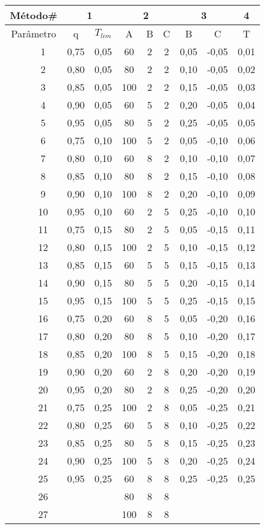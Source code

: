 \begin{table}[htb]
{
	\begin{tabular}{cc|cc|ccc|cc|c}
		\toprule
		\multicolumn{2}{c}{Método\#} & \multicolumn{2}{c}{1} & \multicolumn{3}{c}{2} & \multicolumn{2}{c}{3} & 4\\
		\midrule
		\multicolumn{2}{c}{Parâmetro}	&q&$T_{lim}$&A&B&C&B&C&T \\
		\midrule \midrule					
		\multirow{27}{*}{\rotatebox{90}{Índice da Combinação}} &
		 1 			&0,75&0,05			&60  & 2 & 2			&0,05&-0,05			&0,01\\
		&2 			&0,80&0,05			&80  & 2 & 2			&0,10&-0,05			&0,02\\
		&3 			&0,85&0,05			&100 & 2 & 2			&0,15&-0,05			&0,03\\
		&4 			&0,90&0,05			&60  & 5 & 2			&0,20&-0,05			&0,04\\
		&5 			&0,95&0,05			&80  & 5 & 2			&0,25&-0,05			&0,05\\
		&6 			&0,75&0,10			&100 & 5 & 2			&0,05&-0,10			&0,06\\
		&7 			&0,80&0,10			&60  & 8 & 2			&0,10&-0,10			&0,07\\
		&8 			&0,85&0,10			&80  & 8 & 2			&0,15&-0,10			&0,08\\
		&9 			&0,90&0,10			&100 & 8 & 2			&0,20&-0,10			&0,09\\
		&10			&0,95&0,10			&60  & 2 & 5			&0,25&-0,10			&0,10\\
		&11			&0,75&0,15			&80  & 2 & 5			&0,05&-0,15			&0,11\\
		&12			&0,80&0,15			&100 & 2 & 5			&0,10&-0,15			&0,12\\
		&13			&0,85&0,15			&60  & 5 & 5			&0,15&-0,15			&0,13\\
		&14			&0,90&0,15			&80  & 5 & 5			&0,20&-0,15			&0,14\\
		&15			&0,95&0,15			&100 & 5 & 5			&0,25&-0,15			&0,15\\
		&16			&0,75&0,20			&60  & 8 & 5			&0,05&-0,20			&0,16\\
		&17			&0,80&0,20			&80  & 8 & 5			&0,10&-0,20			&0,17\\
		&18			&0,85&0,20			&100 & 8 & 5			&0,15&-0,20			&0,18\\
		&19			&0,90&0,20			&60  & 2 & 8			&0,20&-0,20			&0,19\\
		&20			&0,95&0,20			&80  & 2 & 8			&0,25&-0,20			&0,20\\
		&21			&0,75&0,25			&100 & 2 & 8			&0,05&-0,25			&0,21\\
		&22			&0,80&0,25			&60  & 5 & 8			&0,10&-0,25			&0,22\\
		&23			&0,85&0,25			&80  & 5 & 8			&0,15&-0,25			&0,23\\
		&24			&0,90&0,25			&100 & 5 & 8			&0,20&-0,25			&0,24\\
		&25			&0,95&0,25			&60  & 8 & 8			&0,25&-0,25			&0,25\\
		&26			&    &    			&80  & 8 & 8			&	 &				&\\
		&27			&    &    			&100 & 8 & 8			&	 &				&\\
		\bottomrule
	\end{tabular}
}{}
\end{table}
